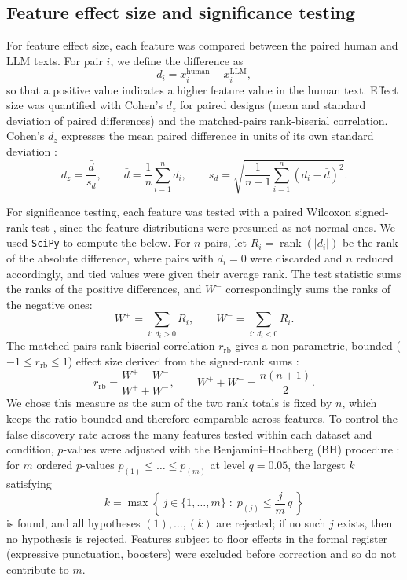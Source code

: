 \documentclass[thesis]{cluu}
\begin{document}
\subsection{Feature effect size and significance testing}
For feature effect size, each feature was compared between the paired human and
LLM texts. For pair $i$, we define the difference as
\begin{equation}
d_i = x_i^{\mathrm{human}} - x_i^{\mathrm{LLM}},
\end{equation}
so that a positive value indicates a higher feature value in the human text.
Effect size was quantified with Cohen's $d_z$ for paired designs (mean and
standard deviation of paired differences) and the matched-pairs rank-biserial
correlation. Cohen's $d_z$ expresses the mean paired difference in units of its
own standard deviation \parencite{cohen1988, lakens2013}:
\begin{equation}
d_z = \frac{\bar{d}}{s_d}, \qquad
\bar{d} = \frac{1}{n}\sum_{i=1}^{n} d_i, \qquad
s_d = \sqrt{\frac{1}{n-1}\sum_{i=1}^{n}\left(d_i - \bar{d}\right)^2}.
\end{equation}

For significance testing, each feature was tested with a paired Wilcoxon
signed-rank test \parencite{wilcoxon1945}, since the feature distributions were
presumed as not normal ones. We used \texttt{SciPy} to compute the below. For $n$
pairs, let $R_i = \operatorname{rank}(|d_i|)$ be the rank of the absolute
difference, where pairs with $d_i = 0$ were discarded and $n$ reduced
accordingly, and tied values were given their average rank. The test statistic
sums the ranks of the positive differences, and $W^{-}$ correspondingly sums the
ranks of the negative ones:
\begin{equation}
W^{+} = \sum_{i:\,d_i > 0} R_i ,
\qquad
W^{-} = \sum_{i:\,d_i < 0} R_i .
\end{equation}
The matched-pairs rank-biserial correlation $r_{\mathrm{rb}}$ gives a
non-parametric, bounded ($-1 \le r_{\mathrm{rb}} \le 1$) effect size derived from
the signed-rank sums \parencite{kerby2014}:
\begin{equation}
r_{\mathrm{rb}} = \frac{W^{+} - W^{-}}{W^{+} + W^{-}},
\qquad
W^{+} + W^{-} = \frac{n(n+1)}{2}.
\end{equation}
We chose this measure as the sum of the two rank totals is fixed by $n$, which
keeps the ratio bounded and therefore comparable across features. To control the
false discovery rate across the many features tested within each dataset and
condition, $p$-values were adjusted with the Benjamini--Hochberg (BH) procedure
\parencite{benjamini1995}: for $m$ ordered $p$-values
$p_{(1)} \le \dots \le p_{(m)}$ at level $q = 0.05$, the largest $k$ satisfying
\begin{equation}
k = \max\left\{\, j \in \{1,\dots,m\} \;:\; p_{(j)} \le \frac{j}{m}\,q \,\right\}
\end{equation}
is found, and all hypotheses $(1),\dots,(k)$ are rejected; if no such $j$ exists,
then no hypothesis is rejected. Features subject to floor effects in the formal
register (expressive punctuation, boosters) were excluded before correction and
so do not contribute to $m$.
\end{document}

